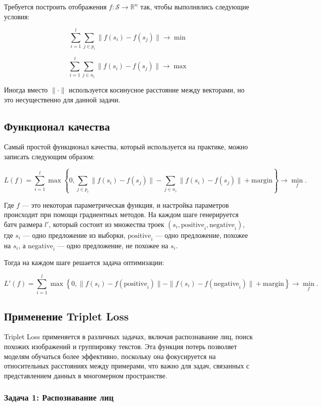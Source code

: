 Требуется построить отображения $f : \mathcal{S} \to \mathbb{R}^{n}$ так, чтобы выполнялись следующие условия:

$$
\sum_{i=1}^{l}\sum_{j \in p_i} \|f(s_i) - f(s_j)\| \to \min
$$

$$
\sum_{i=1}^{l}\sum_{j \in n_i} \|f(s_i) - f(s_j)\| \to \max
$$

Иногда вместо $\|\cdot\|$ используется косинусное расстояние между векторами, но это несущественно для данной задачи.

\subsection*{Функционал качества}

Самый простой функционал качества, который используется на практике, можно записать следующим образом:

$$
L(f) = \sum_{i=1}^{l}\max\left\{0, \sum_{j \in p_i}\|f(s_i) - f(s_j)\| - \sum_{j \in n_i}\|f(s_i) - f(s_j)\| + \text{margin}\right\} \to \min_{f}.
$$

Где $f$ — это некоторая параметрическая функция, и настройка параметров происходит при помощи градиентных методов. На каждом шаге генерируется батч размера $l'$, который состоит из множества троек $(s_i, \text{positive}_i, \text{negative}_i)$, где $s_i$ — одно предложение из выборки, $\text{positive}_i$ — одно предложение, похожее на $s_i$, а $\text{negative}_i$ — одно предложение, не похожее на $s_i$.

Тогда на каждом шаге решается задача оптимизации:

$$
L'(f) = \sum_{i=1}^{l}\max\left\{0, \|f(s_i) - f(\text{positive}_i)\| - \|f(s_i) - f(\text{negative}_i)\| + \text{margin}\right\} \to \min_{f}.
$$

\subsection*{Применение Triplet Loss}

Triplet Loss применяется в различных задачах, включая распознавание лиц, поиск похожих изображений и группировку текстов. Эта функция потерь позволяет моделям обучаться более эффективно, поскольку она фокусируется на относительных расстояниях между примерами, что важно для задач, связанных с представлением данных в многомерном пространстве.

\subsubsection*{Задача 1: Распознавание лиц}

